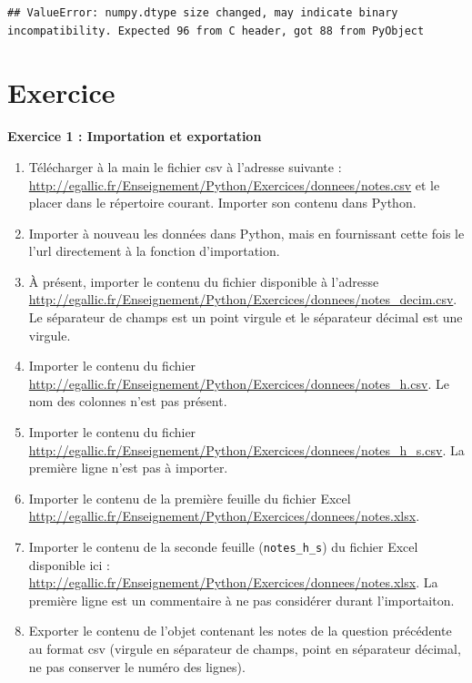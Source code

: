 \documentclass[
  12pt,
]{book}
\makeatletter
\providecommand{\tightlist}{%
  \setlength{\itemsep}{0pt}\setlength{\parskip}{0pt}}
\numberwithin{equation}{section}
\numberwithin{countremarque}{section}
\newenvironment{exframe}{%
 \def\at@end@of@exframe{}%
 \ifinner\ifhmode%
  \def\at@end@of@exframe{\end{minipage}}%
  \begin{minipage}{\columnwidth}%
 \fi\fi%
 \def\FrameCommand##1{\hskip\@totalleftmargin \hskip-\fboxsep
 \colorbox{shadecolorex}{##1}\hskip-\fboxsep
     \hskip-\linewidth \hskip-\@totalleftmargin \hskip\columnwidth}%
 \MakeFramed {\advance\hsize-\width
   \@totalleftmargin\z@ \linewidth\hsize
   \@setminipage}}%
 {\par\unskip\endMakeFramed%
 \at@end@of@exframe}
\makeatother
\begin{document}
\begin{lstlisting}
## ValueError: numpy.dtype size changed, may indicate binary incompatibility. Expected 96 from C header, got 88 from PyObject
\end{lstlisting}

\section{Exercice}\label{exercice-8}

\begin{exframe}
\textbf{Exercice 1 : Importation et exportation}

\begin{enumerate}
\def\labelenumi{\arabic{enumi}.}
\tightlist
\item
  Télécharger à la main le fichier csv à l'adresse suivante : \url{http://egallic.fr/Enseignement/Python/Exercices/donnees/notes.csv} et le placer dans le répertoire courant. Importer son contenu dans Python.
\item
  Importer à nouveau les données dans Python, mais en fournissant cette fois le l'url directement à la fonction d'importation.
\item
  À présent, importer le contenu du fichier disponible à l'adresse \url{http://egallic.fr/Enseignement/Python/Exercices/donnees/notes_decim.csv}. Le séparateur de champs est un point virgule
  et le séparateur décimal est une virgule.
\item
  Importer le contenu du fichier \url{http://egallic.fr/Enseignement/Python/Exercices/donnees/notes_h.csv}. Le nom des colonnes n'est pas présent.
\item
  Importer le contenu du fichier \url{http://egallic.fr/Enseignement/Python/Exercices/donnees/notes_h_s.csv}. La première ligne n'est pas à importer.
\item
  Importer le contenu de la première feuille du fichier Excel \url{http://egallic.fr/Enseignement/Python/Exercices/donnees/notes.xlsx}.
\item
  Importer le contenu de la seconde feuille (\texttt{notes\_h\_s}) du fichier Excel disponible ici : \url{http://egallic.fr/Enseignement/Python/Exercices/donnees/notes.xlsx}. La première ligne est un commentaire à ne pas considérer durant l'importaiton.
\item
  Exporter le contenu de l'objet contenant les notes de la question précédente au format csv (virgule
  en séparateur de champs, point en séparateur décimal, ne pas conserver le numéro des
  lignes).
\end{enumerate}


\end{exframe}
\end{document}
